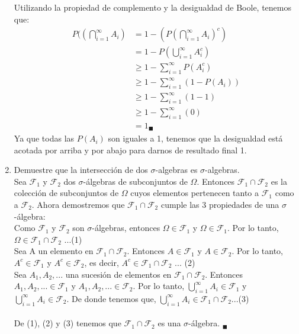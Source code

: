 \documentclass[12pt,a4paper]{report}
\begin{document}
\begin{enumerate}
{Utilizando la propiedad de complemento y la desigualdad de Boole, tenemos que:
\begin{align*}
P((\bigcap\limits_{i=1}^{\infty}A_{i}) &= 1 - (P(\bigcap\limits_{i=1}^{\infty}A_{i})^c) \\
&= 1- P(\bigcup\limits_{i=1}^{\infty}A^c_{i}) \\
&\geqslant 1- \sum_{i=1}^{\infty} P(A^c_{i}) \\
&\geqslant 1- \sum_{i=1}^{\infty} (1- P(A_{i})) \\
&\geqslant 1- \sum_{i=1}^{\infty} (1- 1) \\
&\geqslant 1- \sum_{i=1}^{\infty} (0) \\
&= 1 _{\blacksquare}
\end{align*}
Ya que todas las $P(A_{i})$ son iguales a 1, tenemos que la desigualdad está acotada por arriba y por abajo para darnos de resultado final 1.

  
  
  }

  \item{
 Demuestre que la intersección de dos $\sigma$-algebras es $\sigma$-algebras.\\
 
Sea $\mathcal{F}_{1}$ y $\mathcal{F}_{2}$ dos $\sigma$-álgebras de subconjuntos de $\Omega$. 
Entonces $\mathcal{F}_{1} \cap \mathcal{F}_{2}$ es la colección de subconjuntos de $\Omega$ cuyos elementos pertenecen tanto a $\mathcal{F}_{1}$ como a $\mathcal{F}_{2}$.
Ahora demostremos que $\mathcal{F}_{1} \cap \mathcal{F}_{2}$ cumple las 3 propiedades de una $\sigma$-álgebra:\\
 	Como  $\mathcal{F}_{1}$ y $\mathcal{F}_{2}$ son $\sigma$-álgebras, entonces $\Omega 	\in \mathcal{F}_{1}$ y $\Omega \in \mathcal{F}_{1}$. Por lo tanto, $\Omega \in\mathcal{F}_{1} \cap \mathcal{F}_{2}$ ...(1)\\
 	Sea A un elemento en $\mathcal{F}_{1} \cap \mathcal{F}_{2}$. Entonces $A \in \mathcal{F}_{1}$ y $A \in \mathcal{F}_{2}$. Por lo tanto, $A^c \in \mathcal{F}_{1}$ y $A^c \in \mathcal{F}_{2}$, es decir, $A^c \in\mathcal{F}_{1} \cap \mathcal{F}_{2}$ ... (2)\\
 	Sea $A_{1},A_{2},...$ una sucesión de elementos en $\mathcal{F}_{1} \cap \mathcal{F}_{2}$. Entonces $A_{1},A_{2},... \in \mathcal{F}_{1}$ y $A_{1},A_{2},... \in \mathcal{F}_{2}$. Por lo tanto, $\bigcup\limits_{i=1}^{\infty}A_{i}  \in \mathcal{F}_{1}$ y  $\bigcup\limits_{i=1}^{\infty}A_{i}  \in \mathcal{F}_{2}$. De donde tenemos que, $\bigcup\limits_{i=1}^{\infty}A_{i}  \in \mathcal{F}_{1} \cap \mathcal{F}_{2}$...(3)\\
 	\\De (1), (2) y (3) tenemos que $\mathcal{F}_{1} \cap \mathcal{F}_{2}$ es una  $\sigma$-álgebra. $_{\blacksquare}$
 	
}
\end{enumerate}
\end{document}
